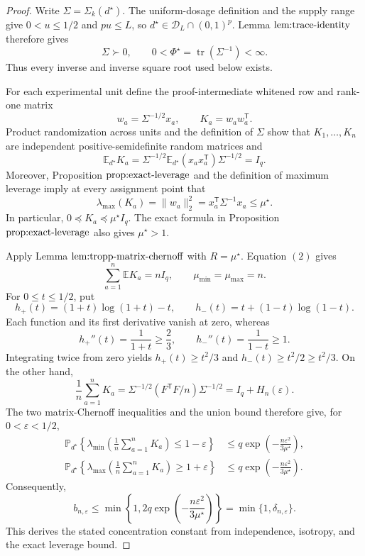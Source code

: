 \documentclass{article}
\begin{document}
\begin{proof}
Write \(\Sigma=\Sigma_k(d^\star)\).  The uniform-dosage definition and the supply range give \(0<u\le1/2\) and \(pu\le L\), so \(d^\star\in\mathcal D_L\cap(0,1)^p\).  Lemma \(\textnormal{lem:trace-identity}\) therefore gives
\[
 \Sigma\succ0,
 \qquad
 0<\Phi^\star=\operatorname{tr}(\Sigma^{-1})<\infty .
 \tag{1}
\]
Thus every inverse and inverse square root used below exists.

For each experimental unit define the proof-intermediate whitened row and rank-one matrix
\[
 w_a=\Sigma^{-1/2}x_a,
 \qquad
 K_a=w_aw_a^{\mathsf T}.
\]
Product randomization across units and the definition of \(\Sigma\) show that \(K_1,\ldots,K_n\) are independent positive-semidefinite random matrices and
\[
 \mathbb E_{d^\star}K_a
 =\Sigma^{-1/2}\mathbb E_{d^\star}(x_ax_a^{\mathsf T})\Sigma^{-1/2}
 =I_q.
 \tag{2}
\]
Moreover, Proposition \(\textnormal{prop:exact-leverage}\) and the definition of maximum leverage imply at every assignment point that
\[
 \lambda_{\max}(K_a)=\|w_a\|_2^2
 =x_a^{\mathsf T}\Sigma^{-1}x_a\le\mu^\star.
 \tag{3}
\]
In particular, \(0\preceq K_a\preceq\mu^\star I_q\).  The exact formula in Proposition \(\textnormal{prop:exact-leverage}\) also gives \(\mu^\star>1\).

Apply Lemma \(\textnormal{lem:tropp-matrix-chernoff}\) with \(R=\mu^\star\).  Equation \((2)\) gives
\[
 \sum_{a=1}^n\mathbb E K_a=nI_q,
 \qquad
 \mu_{\min}=\mu_{\max}=n.
 \tag{4}
\]
For \(0\le t\le1/2\), put
\[
 h_+(t)=(1+t)\log(1+t)-t,
 \qquad
 h_-(t)=t+(1-t)\log(1-t).
\]
Each function and its first derivative vanish at zero, whereas
\[
 h_+''(t)=\frac1{1+t}\ge\frac23,
 \qquad
 h_-''(t)=\frac1{1-t}\ge1.
\]
Integrating twice from zero yields \(h_+(t)\ge t^2/3\) and \(h_-(t)\ge t^2/2\ge t^2/3\).  On the other hand,
\[
 \frac1n\sum_{a=1}^nK_a
 =\Sigma^{-1/2}(F^{\mathsf T}F/n)\Sigma^{-1/2}
 =I_q+H_n(\varepsilon).
 \tag{5}
\]
The two matrix-Chernoff inequalities and the union bound therefore give, for \(0<\varepsilon<1/2\),
\[
\begin{aligned}
 \mathbb P_{d^\star}\!\left\{\lambda_{\min}\!\left(\frac1n\sum_{a=1}^nK_a\right)\le1-\varepsilon\right\}
 &\le q\exp\!\left(-\frac{n\varepsilon^2}{3\mu^\star}\right),\\
 \mathbb P_{d^\star}\!\left\{\lambda_{\max}\!\left(\frac1n\sum_{a=1}^nK_a\right)\ge1+\varepsilon\right\}
 &\le q\exp\!\left(-\frac{n\varepsilon^2}{3\mu^\star}\right).
\end{aligned}
\]
Consequently,
\[
 b_{n,\varepsilon}
 \le\min\!\left\{1,2q\exp\!\left(-\frac{n\varepsilon^2}{3\mu^\star}\right)\right\}
 =\min\{1,\delta_{n,\varepsilon}\}.
 \tag{6}
\]
This derives the stated concentration constant from independence, isotropy, and the exact leverage bound.


\end{proof}
\end{document}
